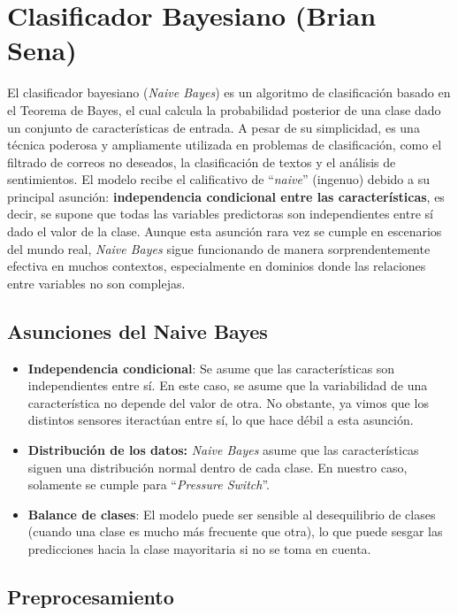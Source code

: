 \documentclass[12pt,letterpaper]{article}
\begin{document}
\section{Clasificador Bayesiano (Brian Sena)}
El clasificador bayesiano (\textit{Naive Bayes}) es un algoritmo de clasificación basado en el Teorema de Bayes, el cual calcula la probabilidad posterior de una clase dado un conjunto de características de entrada. 
A pesar de su simplicidad, es una técnica poderosa y ampliamente utilizada en problemas de clasificación, como el filtrado de correos no deseados, la clasificación de textos y el análisis de sentimientos.
El modelo recibe el calificativo de ``\textit{naive}'' (ingenuo) debido a su principal asunción: \textbf{independencia condicional entre las características}, es decir, se supone que todas las variables predictoras son independientes entre sí dado el valor de la clase. 
Aunque esta asunción rara vez se cumple en escenarios del mundo real, \textit{Naive Bayes} sigue funcionando de manera sorprendentemente efectiva en muchos contextos, especialmente en dominios donde las relaciones entre variables no son complejas.

\subsection{Asunciones del Naive Bayes}
\begin{itemize}
    \item \textbf{Independencia condicional}: Se asume que las características son independientes entre sí. 
        En este caso, se asume que la variabilidad de una característica no depende del valor de otra. No obstante, ya vimos que los distintos sensores iteractúan entre sí, lo que hace débil a esta asunción.
    \item \textbf{Distribución de los datos:} \textit{Naive Bayes} asume que las características siguen una distribución normal dentro de cada clase. En nuestro caso, solamente se cumple para ``\textit{Pressure Switch}''.
    \item \textbf{Balance de clases}: El modelo puede ser sensible al desequilibrio de clases (cuando una clase es mucho más frecuente que otra), lo que puede sesgar las predicciones hacia la clase mayoritaria si no se toma en cuenta.
\end{itemize}

\subsection{Preprocesamiento}
\end{document}
